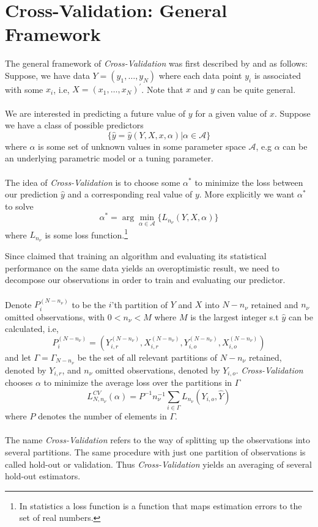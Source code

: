 \documentclass[Research_Module_ES.tex]{subfiles}
\begin{document}
\section{Cross-Validation: General Framework}
The general framework of \textit{Cross-Validation} was first described by \cite{stone1974cross} and  \cite{geisser1975predictive} as follows: \\

Suppose, we have data $Y=(y_1,\ldots,y_N)$ where each data point $y_i$ is associated with some $x_i$, i.e, $X=(x_1,\ldots,x_N)^\prime$. Note that $x$ and $y$ can be quite general.\\
\\
We are interested in predicting a future value of $y$ for a given value of $x$. Suppose we have a class of possible predictors 
\[
	\{\hat{y}=\hat{y}(Y,X,x,\alpha)|\alpha\in\mathscr{A}\}
\]
where $\alpha$ is some set of unknown values in some parameter space $\mathscr{A}$, e.g $\alpha$ can be an underlying parametric model or a tuning parameter.\\
\\
The idea of \textit{Cross-Validation} is to choose some $\alpha^\ast$ to minimize the loss between our prediction $\hat{y}$ and a corresponding real value of $y$. More explicitly we want $\alpha^\ast$ to solve
\[
	\alpha^\ast=\arg\min_{\alpha\in\mathscr{A}}\{L_{n_\nu}(Y,X,\alpha)\}
\]
where $L_{n_\nu}$ is some loss function.\footnote{In statistics a loss function is a function that maps estimation errors to the set of real numbers.  }
 
Since \cite{larson1931shrinkage} claimed that training an algorithm and evaluating its statistical performance on the same data yields an overoptimistic result, we need to decompose our observations in order to train and evaluating our predictor. \\
\\
Denote $P^{(N-n_\nu)}_i$ to be the $i$'th partition of $Y$ and $X$ into $N-n_\nu$ retained and $n_\nu$ omitted observations, with $0<n_\nu<M$ where $M$ is the largest integer s.t $\hat{y}$ can be calculated, i.e,
\[
	P^{(N-n_\nu)}_i=(Y_{i,r}^{(N-n_\nu)},X_{i,r}^{(N-n_\nu)},Y_{i,o}^{(N-n_\nu)},X_{i,o}^{(N-n_\nu)})
\]
and let $\Gamma=\Gamma_{N-n_\nu}$ be the set of all relevant partitions of $N-n_\nu$ retained, denoted by $Y_{i,r}$, and $n_\nu$ omitted observations, denoted by $Y_{i,o}$. \textit{Cross-Validation} chooses $\alpha$ to minimize the average loss over the partitions in $\Gamma$ 
\[
	L_{N,n_\nu}^{CV}(\alpha)=P^{-1}n_\nu^{-1}\sum_{i\in\Gamma}L_{n_\nu}(Y_{i,o},\hat{Y})
\]
where $P$ denotes the number of elements in $\Gamma$.\\
\\
The name \textit{Cross-Validation} refers to the way of splitting up the observations into several partitions. The same procedure with just one partition of observations is called hold-out or validation. Thus \textit{Cross-Validation} yields an averaging of several hold-out estimators.
\end{document}

